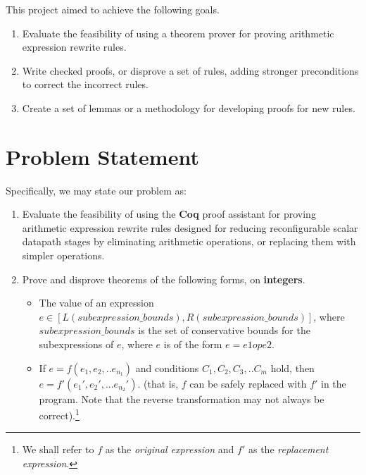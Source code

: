 This project aimed to achieve the following goals.

\begin{enumerate}
\def\labelenumi{\arabic{enumi}.}
\item
  Evaluate the feasibility of using a theorem prover for proving
  arithmetic expression rewrite rules.
\item
  Write checked proofs, or disprove a set of rules, adding stronger
  preconditions to correct the incorrect rules.
\item
  Create a set of lemmas or a methodology for developing proofs for new
  rules.
\end{enumerate}

\hypertarget{problem-statement}{%
\section{Problem Statement}\label{problem-statement}}

Specifically, we may state our problem as:

\begin{enumerate}
\def\labelenumi{\arabic{enumi}.}
\item
  Evaluate the feasibility of using the \textbf{Coq} proof assistant for
  proving arithmetic expression rewrite rules designed for reducing
  reconfigurable scalar datapath stages by eliminating arithmetic
  operations, or replacing them with simpler operations.
\item
  Prove and disprove theorems of the following forms, on
  \textbf{integers}.

  \begin{itemize}
  \tightlist
  \item
    The value of an expression
    \(e \in [L({subexpression\_bounds}), R({subexpression\_bounds})]\),
    where \({subexpression\_bounds}\) is the set of conservative bounds
    for the subexpressions of \(e\), where \(e\) is of the form
    \(e = e1 op e2\).
  \item
    If \(e = f(e_1, e_2, .. e_{n_1})\) and conditions
    \(C_1, C_2, C_3, .. C_m\) hold, then
    \(e = f'(e_1', e_2', ... e_{n_2}')\). (that is, \(f\) can be safely
    replaced with \(f'\) in the program. Note that the reverse
    transformation may not always be correct).\footnote{We shall refer
      to \(f\) as the \emph{original expression} and \(f'\) as the
      \emph{replacement expression}.}
  \end{itemize}
\end{enumerate}

